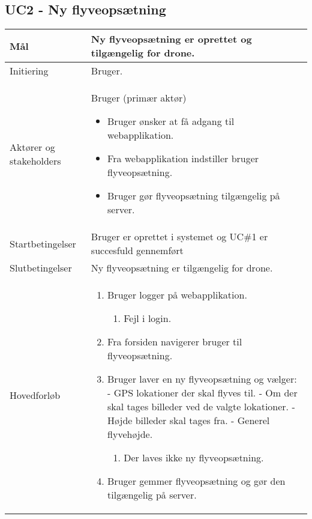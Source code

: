 \subsection*{UC2 - Ny flyveopsætning}

\begin{table}[H]
\begin{tabular}{| p{3cm}| p{11.5cm}|}
\hline

Mål	 							& Ny flyveopsætning er oprettet og tilgængelig for drone. \\\hline
Initiering							& Bruger. \\\hline
Aktører og \newline stakeholders			& Bruger (primær aktør) 
										\begin{itemize}
											\item Bruger ønsker at få adgang til webapplikation.
											\item Fra webapplikation indstiller bruger flyveopsætning.
											\item Bruger gør flyveopsætning tilgængelig på server.
										\end{itemize} \\ \hline
									  
Startbetingelser						& Bruger er oprettet i systemet og UC\#1 er succesfuld gennemført  \\\hline
Slutbetingelser						& Ny flyveopsætning er tilgængelig for drone. \\\hline
Hovedforløb				&
 
									\renewcommand{\labelenumi}{\arabic{enumi}.}
									\renewcommand{\labelenumii}{\Roman{enumii}:}

									\begin{enumerate}[topsep=0.0cm, leftmargin=0.5cm]
										\item Bruger logger på webapplikation.
										\begin{enumerate}[a:,partopsep=4cm, topsep=0cm, leftmargin=1cm]
												\item Fejl i login.
												
										\end{enumerate}
										\item Fra forsiden navigerer bruger til flyveopsætning.
										\item Bruger laver en ny flyveopsætning og vælger:	\newline	
											  - GPS lokationer der skal flyves til. \newline
											  - Om der skal tages billeder ved de valgte lokationer. \newline 
											  - Højde billeder skal tages fra. \newline
											  - Generel flyvehøjde.  		
										\begin{enumerate}[b:,topsep=0cm, leftmargin=1cm]
												\item Der laves ikke ny flyveopsætning.
										\end{enumerate}
										\item Bruger gemmer flyveopsætning og gør den tilgængelig på server.
									\end{enumerate} \\\hline	


\end{tabular}
\end{table}

